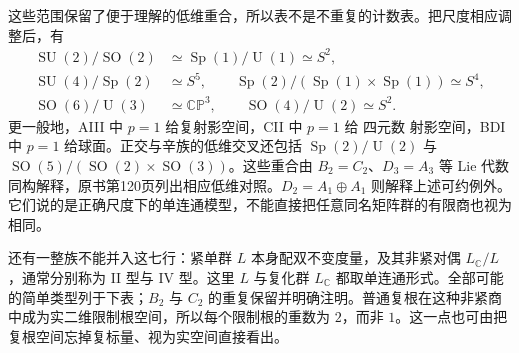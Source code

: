 \ProseParagraphBreak

这些范围保留了便于理解的低维重合，所以表不是不重复的计数表。把尺度相应调整后，有
\[
	\begin{aligned}
	\operatorname{SU}(2)/\operatorname{SO}(2)
	&\simeq\operatorname{Sp}(1)/\operatorname U(1)\simeq S^2,\\
	\operatorname{SU}(4)/\operatorname{Sp}(2)&\simeq S^5,\qquad
	\operatorname{Sp}(2)/(\operatorname{Sp}(1)\times\operatorname{Sp}(1))\simeq S^4,\\
	\operatorname{SO}(6)/\operatorname U(3)&\simeq\mathbb{CP}^3,\qquad
	\operatorname{SO}(4)/\operatorname U(2)\simeq S^2.
	\end{aligned}
\]
更一般地，AIII 中 \(p=1\) 给复射影空间，CII 中 \(p=1\) 给 四元数 射影空间，BDI 中 \(p=1\) 给球面。正交与辛族的低维交叉还包括 \(\operatorname{Sp}(2)/\operatorname U(2)\) 与 \(\operatorname{SO}(5)/(\operatorname{SO}(2)\times\operatorname{SO}(3))\)。这些重合由 \(B_2=C_2\)、\(D_3=A_3\) 等 Lie 代数同构解释，原书第120页列出相应低维对照。\(D_2=A_1\oplus A_1\) 则解释上述可约例外。它们说的是正确尺度下的单连通模型，不能直接把任意同名矩阵群的有限商也视为相同。

\ProseParagraphBreak

还有一整族不能并入这七行：紧单群 \(L\) 本身配双不变度量，及其非紧对偶 \(L_{\mathbb C}/L\)，通常分别称为 II 型与 IV 型。这里 \(L\) 与复化群 \(L_{\mathbb C}\) 都取单连通形式。全部可能的简单类型列于下表；\(B_2\) 与 \(C_2\) 的重复保留并明确注明。普通复根在这种非紧商中成为实二维限制根空间，所以每个限制根的重数为 \(2\)，而非 \(1\)。这一点也可由把复根空间忘掉复标量、视为实空间直接看出。

